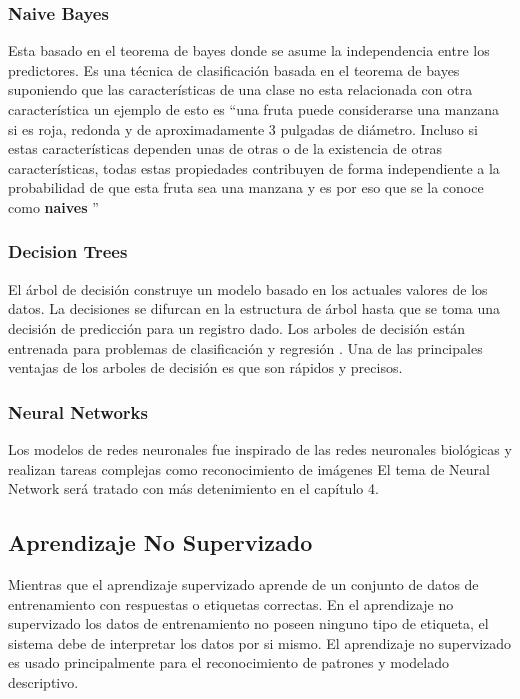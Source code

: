 \subsubsection*{Naive Bayes}
Esta basado en el teorema de bayes donde se asume la independencia entre los predictores.
Es una técnica de clasificación basada en el teorema de bayes suponiendo que las características de una clase no esta relacionada con otra característica un ejemplo de esto es \textquotedblleft una fruta puede considerarse una manzana si es roja, redonda y de aproximadamente 3 pulgadas de diámetro. Incluso si estas características dependen unas de otras o de la existencia de otras características, todas estas propiedades contribuyen de forma independiente a la probabilidad de que esta fruta sea una manzana y es por eso que se la conoce como \textbf{naives}  \textquotedblright \cite{WEBSITE:4}
\subsubsection*{Decision Trees}
El árbol de decisión construye un modelo basado en los actuales valores de los datos. La decisiones se difurcan en la estructura de árbol hasta que se toma una decisión de predicción para un registro dado. Los arboles de decisión están entrenada para problemas de clasificación y regresión . Una de las principales ventajas de los arboles de decisión es que son rápidos y precisos.
\subsubsection*{Neural Networks}
Los modelos de redes neuronales fue inspirado de las redes neuronales biológicas y realizan tareas complejas como reconocimiento de imágenes
El tema de Neural Network será tratado con más detenimiento en el capítulo 4.
\subsection{Aprendizaje No Supervizado}
Mientras que el aprendizaje supervizado aprende  de un conjunto de datos de entrenamiento con respuestas o etiquetas correctas. En el aprendizaje no supervizado los datos de entrenamiento no poseen ninguno tipo de etiqueta, el sistema debe de interpretar los datos por si mismo.
El aprendizaje no supervizado es usado principalmente para el reconocimiento de patrones y modelado descriptivo.

